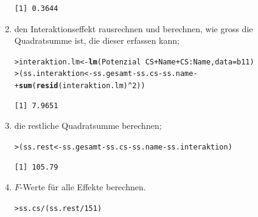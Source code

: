 \documentclass[oneside, 10pt]{book}\usepackage[]{graphicx}\usepackage[]{xcolor}
\makeatletter
\newcommand{\hlnum}[1]{\textcolor[rgb]{0.686,0.059,0.569}{#1}}%
\newcommand{\hlopt}[1]{\textcolor[rgb]{0,0,0}{#1}}%
\newcommand{\hlstd}[1]{\textcolor[rgb]{0.345,0.345,0.345}{#1}}%
\newcommand{\hlkwb}[1]{\textcolor[rgb]{0.69,0.353,0.396}{#1}}%
\newcommand{\hlkwc}[1]{\textcolor[rgb]{0.333,0.667,0.333}{#1}}%
\newcommand{\hlkwd}[1]{\textcolor[rgb]{0.737,0.353,0.396}{\textbf{#1}}}%
\newenvironment{kframe}{%
 \def\at@end@of@kframe{}%
 \ifinner\ifhmode%
  \def\at@end@of@kframe{\end{minipage}}%
  \begin{minipage}{\columnwidth}%
 \fi\fi%
 \def\FrameCommand##1{\hskip\@totalleftmargin \hskip-\fboxsep
 \colorbox{shadecolor}{##1}\hskip-\fboxsep
     \hskip-\linewidth \hskip-\@totalleftmargin \hskip\columnwidth}%
 \MakeFramed {\advance\hsize-\width
   \@totalleftmargin\z@ \linewidth\hsize
   \@setminipage}}%
 {\par\unskip\endMakeFramed%
 \at@end@of@kframe}
\newenvironment{knitrout}{}{} %
\makeatother
\begin{document}
\begin{enumerate}
\begin{knitrout}
\begin{kframe}
\begin{alltt}
\end{alltt}
\begin{verbatim}
[1] 0.3644
\end{verbatim}
\end{kframe}
\end{knitrout}
 \item den Interaktionseffekt rausrechnen und berechnen,
 wie gross die Quadratsumme ist, die dieser erfassen kann;
\begin{knitrout}
\color{fgcolor}\begin{kframe}
\begin{alltt}
\hlstd{> }\hlstd{interaktion.lm} \hlkwb{<-} \hlkwd{lm}\hlstd{(Potenzial} \hlopt{~} \hlstd{CS} \hlopt{+} \hlstd{Name} \hlopt{+} \hlstd{CS}\hlopt{:}\hlstd{Name,} \hlkwc{data} \hlstd{= b11)}
\hlstd{> }\hlstd{(ss.interaktion} \hlkwb{<-} \hlstd{ss.gesamt} \hlopt{-} \hlstd{ss.cs} \hlopt{-} \hlstd{ss.name} \hlopt{-}
\hlstd{+ }    \hlkwd{sum}\hlstd{(}\hlkwd{resid}\hlstd{(interaktion.lm)}\hlopt{^}\hlnum{2}\hlstd{))}
\end{alltt}
\begin{verbatim}
[1] 7.9651
\end{verbatim}
\end{kframe}
\end{knitrout}
 \item die restliche Quadratsumme berechnen;
\begin{knitrout}
\color{fgcolor}\begin{kframe}
\begin{alltt}
\hlstd{> }\hlstd{(ss.rest} \hlkwb{<-} \hlstd{ss.gesamt} \hlopt{-} \hlstd{ss.cs} \hlopt{-} \hlstd{ss.name} \hlopt{-} \hlstd{ss.interaktion)}
\end{alltt}
\begin{verbatim}
[1] 105.79
\end{verbatim}
\end{kframe}
\end{knitrout}
 \item $F$-Werte für alle Effekte berechnen.
\begin{knitrout}
\color{fgcolor}\begin{kframe}
\begin{alltt}
\hlstd{> }\hlstd{ss.cs} \hlopt{/} \hlstd{(ss.rest}\hlopt{/}\hlnum{151}\hlstd{)}
\end{alltt}
\begin{verbatim}

\end{verbatim}
\end{kframe}
\end{knitrout}
\end{enumerate}
\end{document}
